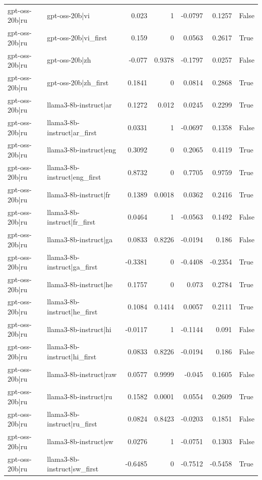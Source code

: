 \begin{table}
\begin{tabular}{l l r r r r l}
gpt-oss-20b|ru & gpt-oss-20b|vi & 0.023 & 1 & -0.0797 & 0.1257 & False \\
gpt-oss-20b|ru & gpt-oss-20b|vi_first & 0.159 & 0 & 0.0563 & 0.2617 & True \\
gpt-oss-20b|ru & gpt-oss-20b|zh & -0.077 & 0.9378 & -0.1797 & 0.0257 & False \\
gpt-oss-20b|ru & gpt-oss-20b|zh_first & 0.1841 & 0 & 0.0814 & 0.2868 & True \\
gpt-oss-20b|ru & llama3-8b-instruct|ar & 0.1272 & 0.012 & 0.0245 & 0.2299 & True \\
gpt-oss-20b|ru & llama3-8b-instruct|ar_first & 0.0331 & 1 & -0.0697 & 0.1358 & False \\
gpt-oss-20b|ru & llama3-8b-instruct|eng & 0.3092 & 0 & 0.2065 & 0.4119 & True \\
gpt-oss-20b|ru & llama3-8b-instruct|eng_first & 0.8732 & 0 & 0.7705 & 0.9759 & True \\
gpt-oss-20b|ru & llama3-8b-instruct|fr & 0.1389 & 0.0018 & 0.0362 & 0.2416 & True \\
gpt-oss-20b|ru & llama3-8b-instruct|fr_first & 0.0464 & 1 & -0.0563 & 0.1492 & False \\
gpt-oss-20b|ru & llama3-8b-instruct|ga & 0.0833 & 0.8226 & -0.0194 & 0.186 & False \\
gpt-oss-20b|ru & llama3-8b-instruct|ga_first & -0.3381 & 0 & -0.4408 & -0.2354 & True \\
gpt-oss-20b|ru & llama3-8b-instruct|he & 0.1757 & 0 & 0.073 & 0.2784 & True \\
gpt-oss-20b|ru & llama3-8b-instruct|he_first & 0.1084 & 0.1414 & 0.0057 & 0.2111 & True \\
gpt-oss-20b|ru & llama3-8b-instruct|hi & -0.0117 & 1 & -0.1144 & 0.091 & False \\
gpt-oss-20b|ru & llama3-8b-instruct|hi_first & 0.0833 & 0.8226 & -0.0194 & 0.186 & False \\
gpt-oss-20b|ru & llama3-8b-instruct|raw & 0.0577 & 0.9999 & -0.045 & 0.1605 & False \\
gpt-oss-20b|ru & llama3-8b-instruct|ru & 0.1582 & 0.0001 & 0.0554 & 0.2609 & True \\
gpt-oss-20b|ru & llama3-8b-instruct|ru_first & 0.0824 & 0.8423 & -0.0203 & 0.1851 & False \\
gpt-oss-20b|ru & llama3-8b-instruct|sw & 0.0276 & 1 & -0.0751 & 0.1303 & False \\
gpt-oss-20b|ru & llama3-8b-instruct|sw_first & -0.6485 & 0 & -0.7512 & -0.5458 & True \\

\end{tabular}
\end{table}
